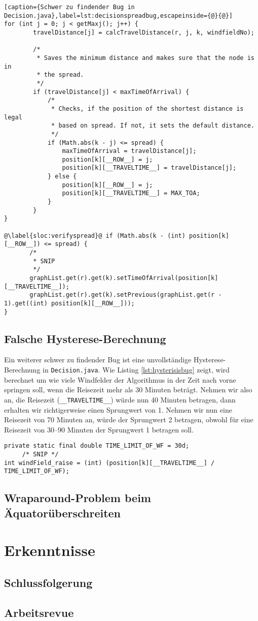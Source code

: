 \begin{lstlisting}[caption={Schwer zu findender Bug in
Decision.java},label=lst:decisionspreadbug,escapeinside={@}{@}]
for (int j = 0; j < getMaxj(); j++) {
        travelDistance[j] = calcTravelDistance(r, j, k, windfieldNo);
        
        /*
         * Saves the minimum distance and makes sure that the node is in
         * the spread.
         */
        if (travelDistance[j] < maxTimeOfArrival) {
        	/*
        	 * Checks, if the position of the shortest distance is legal
        	 * based on spread. If not, it sets the default distance.
        	 */
        	if (Math.abs(k - j) <= spread) {
        		maxTimeOfArrival = travelDistance[j];
        		position[k][__ROW__] = j;
        		position[k][__TRAVELTIME__] = travelDistance[j];
        	} else {
        		position[k][__ROW__] = j;
        		position[k][__TRAVELTIME__] = MAX_TOA;
        	}
        }
}

@\label{sloc:verifyspread}@ if (Math.abs(k - (int) position[k][__ROW__]) <= spread) {
       /*
        * SNIP
        */
       graphList.get(r).get(k).setTimeOfArrival(position[k][__TRAVELTIME__]);
       graphList.get(r).get(k).setPrevious(graphList.get(r - 1).get((int) position[k][__ROW__]));
}

\end{lstlisting}

\subsection{Falsche Hysterese-Berechnung}
Ein weiterer schwer zu findender Bug ist eine unvollständige
Hysterese-Berechnung in \texttt{Decision.java}. Wie Listing
\ref{lst:hysterisisbug} zeigt, wird berechnet um wie viele Windfelder der
Algorithmus in der Zeit nach vorne springen soll, wenn die Reisezeit mehr als
30 Minuten beträgt. Nehmen wir also an, die Reisezeit
(\texttt{\_\_TRAVELTIME\_\_}) würde nun 40 Minuten betragen, dann erhalten wir
richtigerweise einen Sprungwert von 1. Nehmen wir nun eine Reisezeit von 70
Minuten an, würde der Sprungwert 2 betragen, obwohl für eine Reisezeit von
30--90 Minuten der Sprungwert 1 betragen soll.
\begin{lstlisting}[caption={Hystereseberechnung in Decision.java},label=lst:hysterisisbug]
private static final double TIME_LIMIT_OF_WF = 30d;
     /* SNIP */
int windField_raise = (int) (position[k][__TRAVELTIME__] / TIME_LIMIT_OF_WF);
\end{lstlisting}

\subsection{Wraparound-Problem beim Äquatorüberschreiten}


\section{Erkenntnisse}
\subsection{Schlussfolgerung}
\subsection{Arbeitsrevue}
